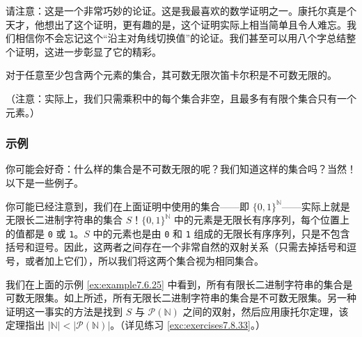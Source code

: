 请注意：这是一个非常巧妙的论证。这是我最喜欢的数学证明之一。康托尔真是个天才，他想出了这个证明，更有趣的是，这个证明实际上相当简单且令人难忘。我们相信你不会忘记这个``沿主对角线切换值''的论证。我们甚至可以用八个字总结整个证明，这进一步彰显了它的精彩。

\begin{corollary}
    对于任意至少包含两个元素的集合，其可数无限次笛卡尔积是不可数无限的。
\end{corollary}
（注意：实际上，我们只需乘积中的每个集合非空，且最多有有限个集合只有一个元素。）

\subsubsection*{示例}

你可能会好奇：什么样的集合是不可数无限的呢？我们知道这样的集合吗？当然！以下是一些例子。

\begin{example}[所有无限长二进制字符串的集合]

    你可能已经注意到，我们在上面证明中使用的集合——即 $\{0, 1\}^\mathbb{N}$——实际上就是无限长二进制字符串的集合 $S$！$\{0, 1\}^\mathbb{N}$ 中的元素是无限长有序序列，每个位置上的值都是 \verb|0| 或 \verb|1|。$S$ 中的元素也是由 \verb|0| 和 \verb|1| 组成的无限长有序序列，只是不包含括号和逗号。因此，这两者之间存在一个非常自然的双射关系（只需去掉括号和逗号，或者加上它们），所以我们将这两个集合视为相同集合。

    我们在上面的示例 \ref{ex:example7.6.25} 中看到，所有有限长二进制字符串的集合是可数无限集。如上所述，所有无限长二进制字符串的集合是不可数无限集。另一种证明这一事实的方法是找到 $S$ 与 $\mathcal{P}(\mathbb{N})$ 之间的双射，然后应用康托尔定理，该定理指出 $|\mathbb{N}| < |\mathcal{P}(\mathbb{N})|$。（详见练习 \ref{exc:exercises7.8.33}。）
\end{example}

